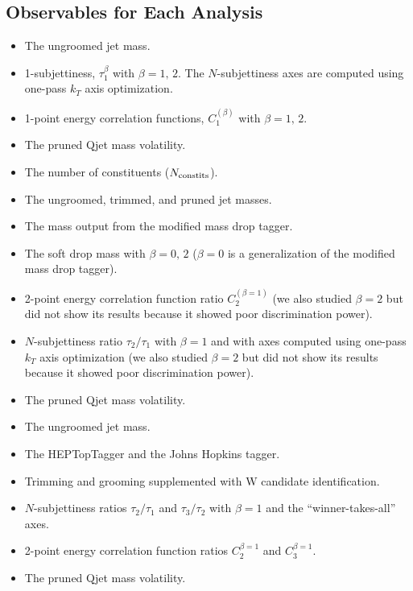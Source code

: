 \subsection{Observables for Each Analysis}

\begin{itemize}
\item The ungroomed jet mass.
\item 1-subjettiness, $\tau_1^{\beta}$ with $\beta=1,\,2$. The $N$-subjettiness axes are computed using one-pass $k_T$ axis optimization.
\item 1-point energy correlation functions, $C_1^{(\beta)}$ with $\beta=1,\,2$.
\item The pruned Qjet mass volatility.
\item The number of constituents ($N_{\rm constits}$).
\end{itemize}

\begin{itemize}
\item The ungroomed, trimmed, and pruned jet masses.
\item The mass output from the modified mass drop tagger.
\item The soft drop mass with $\beta=0,\,2$ ($\beta=0$ is a generalization of the modified mass drop tagger).
\item 2-point energy correlation function ratio $C_2^{(\beta=1)}$  (we also studied $\beta=2$ but did not show its results because it showed poor discrimination power).
\item $N$-subjettiness ratio $\tau_2 / \tau_1$ with $\beta=1$ and with axes computed using one-pass $k_T$ axis optimization (we also studied $\beta=2$ but did not show its results because it showed poor discrimination power).
\item The pruned Qjet mass volatility.
\end{itemize}

\begin{itemize}
\item The ungroomed jet mass.
\item The HEPTopTagger and the Johns Hopkins tagger.
\item Trimming and grooming supplemented with W candidate identification.
\item $N$-subjettiness ratios $\tau_2 / \tau_1$ and $\tau_3/\tau_2$ with $\beta=1$ and the ``winner-takes-all'' axes.
\item 2-point energy correlation function ratios $C_2^{\beta=1}$ and $C_3^{\beta=1}$.
\item The pruned Qjet mass volatility.
\end{itemize}







